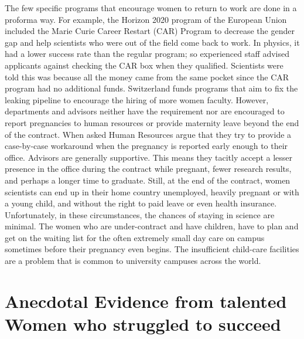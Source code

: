 \documentclass[utf8]{frontiersSCNS} %
\begin{document}
The few specific programs that encourage women to return to work are done in a proforma way. For example, the Horizon 2020 program of the European Union included the Marie Curie Career Restart (CAR) Program to decrease the gender gap and help scientists who were out of the field come back to work. In physics, it had a lower success rate than the regular program; so experienced staff advised applicants against checking the CAR box when they qualified. Scientists were told this was because all the money came from the same pocket since the CAR program had no additional funds.  Switzerland funds programs that aim to fix the leaking pipeline to encourage the hiring of more women faculty. However, departments and advisors neither have the requirement nor are encouraged to report pregnancies to human resources or provide maternity leave beyond the end of the contract. When asked Human Resources argue that they try to provide a case-by-case workaround when the pregnancy is reported early enough to their office. Advisors are generally supportive. This means they tacitly accept a lesser presence in the office during the contract while pregnant, fewer research results, and perhaps a longer time to graduate. Still, at the end of the contract, women scientists can end up in their home country unemployed, heavily pregnant or with a young child, and without the right to paid leave or even health insurance. Unfortunately, in these circumstances, the chances of staying in science are minimal. The women who are under-contract and have children, have to plan and get on the waiting list for the often extremely small day care on campus sometimes before their pregnancy even begins. The insufficient child-care facilities are a problem that is common to university campuses across the world.

\section{Anecdotal Evidence from talented Women who struggled to succeed}
\end{document}

